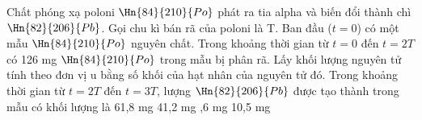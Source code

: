 \begin{vidu}%
 Chất phóng xạ poloni $\Hn{84}{210}{Po}$ phát ra tia alpha và biến đổi thành chì $\Hn{82}{206}{Pb}$. Gọi chu kì bán rã của poloni là T. Ban đầu ($t = 0$) có một mẫu $\Hn{84}{210}{Po}$ nguyên chất. Trong khoảng thời gian từ $t = 0$ đến $t = 2T$ có 126 mg $\Hn{84}{210}{Po}$ trong mẫu bị phân rã. Lấy khối lượng nguyên tử tính theo đơn vị u bằng số khối của hạt nhân của nguyên tử đó. Trong khoảng thời gian từ $t = 2T$ đến $t = 3T$, lượng $\Hn{82}{206}{Pb}$ được tạo thành trong mẫu có khối lượng là
\choice
{61,8 mg}
{41,2 mg}
{,6 mg}
{10,5 mg}
\end{vidu}

